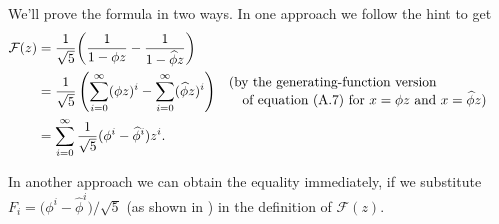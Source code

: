 We'll prove the formula in two ways.
In one approach we follow the hint to get
\begin{align*}
    \mathcal{F}(z) &= \frac{1}{\sqrt{5}}\biggl(\frac{1}{1-\phi z}-\frac{1}{1-\widehat\phi z}\biggr) \\
    &= \frac{1}{\sqrt{5}}\left(\sum_{i=0}^\infty(\phi z)^i-\sum_{i=0}^\infty(\widehat\phi z)^i\right) && \begin{minipage}{2.75in}(by the generating-function version\\\null\quad of equation (A.7) for $x=\phi z$ and $x=\widehat\phi z$)\end{minipage}\\
    &= \sum_{i=0}^\infty\frac{1}{\sqrt{5}}(\phi^i-\widehat\phi^i)z^i.
\end{align*}

In another approach we can obtain the equality immediately, if we substitute $F_i=\bigl(\phi^i-\widehat\phi^i\bigr)/\!\sqrt{5}$ (as shown in ) in the definition of $\mathcal{F}(z)$.
